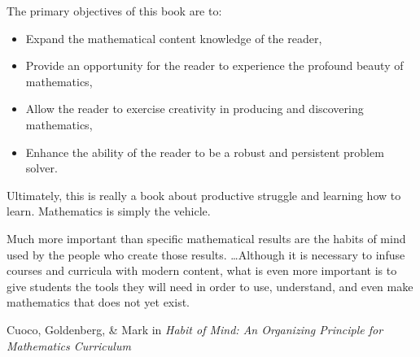 The primary objectives of this book are to:
\begin{itemize}
\item Expand the mathematical content knowledge of the reader,
\item Provide an opportunity for the reader to experience the profound beauty of mathematics,
\item Allow the reader to exercise creativity in producing and discovering mathematics,
\item Enhance the ability of the reader to be a robust and persistent problem solver.
\end{itemize}
Ultimately, this is really a book about productive struggle and learning how to learn. Mathematics is simply the vehicle.

\epigraph{Much more important than specific mathematical results are the habits of mind used by the people who create those results. \ldots Although it is necessary to infuse courses and curricula with modern content, what is even more important is to give students the tools they will need in order to use, understand, and even make mathematics that does not yet exist.}{Cuoco, Goldenberg, \& Mark in \emph{Habit of Mind: An Organizing Principle for Mathematics Curriculum}}